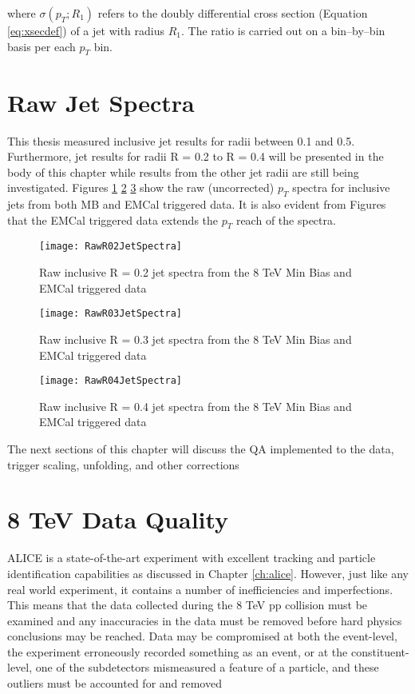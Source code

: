 \noindent
where $\sigma(p_{T};R_{1})$ refers to the doubly differential cross section (Equation \ref{eq:xsecdef}) of a jet with radius $R_{1}$.  The ratio is carried out on a bin--by--bin basis per each $p_{T}$ bin.  

\section{Raw Jet Spectra}

This thesis measured inclusive jet results for radii between 0.1 and 0.5.  Furthermore, jet results for radii R = 0.2 to R = 0.4 will be presented in the body of this chapter while results from the other jet radii are still being investigated.  Figures \ref{fig:rawjetR02} \ref{fig:rawjetR03} \ref{fig:rawjetR04} show the raw (uncorrected) $p_{T}$ spectra for inclusive jets from both MB and EMCal triggered data.  It is also evident from Figures that the EMCal triggered data extends the $p_{T}$ reach of the spectra.

\begin{figure}[h]
\texttt{[image: RawR02JetSpectra]}
\centering
\caption{Raw inclusive R = 0.2 jet spectra from the 8 TeV Min Bias and EMCal triggered data}
\label{fig:rawjetR02}
\end{figure}
\begin{figure}[h]
\texttt{[image: RawR03JetSpectra]}
\centering
\caption{Raw inclusive R = 0.3 jet spectra from the 8 TeV Min Bias and EMCal triggered data}
\label{fig:rawjetR03}
\end{figure}
\begin{figure}[h]
\texttt{[image: RawR04JetSpectra]}
\centering
\caption{Raw inclusive R = 0.4 jet spectra from the 8 TeV Min Bias and EMCal triggered data}
\label{fig:rawjetR04}
\end{figure}

\noindent
The next sections of this chapter will discuss the QA implemented to the data, trigger scaling, unfolding, and other corrections 

\section{8 TeV Data Quality}
ALICE is a state-of-the-art experiment with excellent tracking and particle identification capabilities as discussed in Chapter \ref{ch:alice}.  However, just like any real world experiment, it contains a number of inefficiencies and imperfections.  This means that the data collected during the 8 TeV pp collision must be examined and any inaccuracies in the data must be removed before hard physics conclusions may be reached.  Data may be compromised at both the event-level, the experiment erroneously recorded something as an event, or at the constituent-level, one of the subdetectors mismeasured a feature of a particle, and these outliers must be accounted for and removed 


